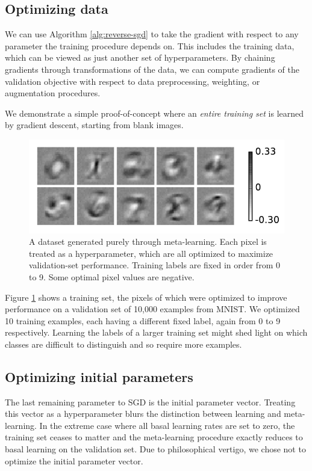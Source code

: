 \documentclass{article}
\newcommand{\primal}{basal }
\begin{document}
\subsection{Optimizing data}

We can use Algorithm \ref{alg:reverse-sgd} to take the gradient with respect to any parameter the training procedure depends on.
This includes the training data, which can be viewed as just another set of hyperparameters.
By chaining gradients through transformations of the data, we can compute gradients of the validation objective with respect to data preprocessing, weighting, or augmentation procedures.

We demonstrate a simple proof-of-concept where an \emph{entire training set} is learned by gradient descent, starting from blank images.
%
\begin{figure}[h!]
\begin{center}
\includegraphics[width=\columnwidth]{../experiments/Jan_19_optimize_data/9_color_bar/fake_data.pdf}
\caption{A dataset generated purely through meta-learning.
Each pixel is treated as a hyperparameter, which are all optimized to maximize validation-set performance.
Training labels are fixed in order from 0 to 9.
Some optimal pixel values are negative.}
\label{fig:fake data}
\end{center}
\end{figure} 
%
Figure \ref{fig:fake data} shows a training set, the pixels of which were optimized to improve performance on a validation set of 10,000 examples from MNIST.
We optimized 10 training examples, each having a different fixed label, again from 0 to 9 respectively.
Learning the labels of a larger training set might shed light on which classes are difficult to distinguish and so require more examples.

\subsection{Optimizing initial parameters}
The last remaining parameter to SGD is the initial parameter vector.
Treating this vector as a hyperparameter blurs the distinction between learning and meta-learning.
In the extreme case where all \primal{} learning rates are set to zero, the training set ceases to matter and the meta-learning procedure exactly reduces to \primal{} learning on the validation set.
Due to philosophical vertigo, we chose not to optimize the initial parameter vector.
\end{document}
